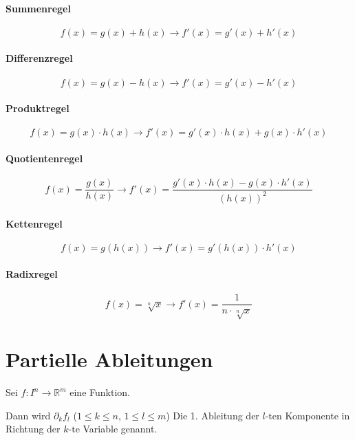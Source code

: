 \documentclass[a4paper, 11pt, accentcolor = tud3b]{tudreport}
\begin{document}
                \paragraph{Summenregel}
                    \[ f(x) = g(x) + h(x) \rightarrow f'(x) = g'(x) + h'(x) \]

                \paragraph{Differenzregel}
                    \[ f(x) = g(x) - h(x) \rightarrow f'(x) = g'(x) - h'(x) \]

                \paragraph{Produktregel}
                    \[ f(x) = g(x) \cdot h(x) \rightarrow f'(x) = g'(x) \cdot h(x) + g(x) \cdot h'(x) \]

                \paragraph{Quotientenregel}
                    \[ f(x) = \frac{g(x)}{h(x)} \rightarrow f'(x) = \frac{g'(x) \cdot h(x) - g(x) \cdot h'(x)}{(h(x)) ^ 2} \]

                \paragraph{Kettenregel}
                    \[ f(x) = g(h(x)) \rightarrow f'(x) = g'(h(x)) \cdot h'(x) \]

                \paragraph{Radixregel}
                \[ f(x) = \sqrt[n]{x} \rightarrow f'(x) = \frac{1}{n \cdot \sqrt[n]{x}} \]

        \section{Partielle Ableitungen}
            Sei $ f : I ^ n \rightarrow \mathbb{R} ^ m $ eine Funktion.

            Dann wird $ \partial _ k f _ l $ ($ 1 \leq k \leq n $, $ 1 \leq l \leq m $) Die 1. Ableitung der $ l\text{-ten} $ Komponente in Richtung der $ k\text{-te} $ Variable genannt.
\end{document}
